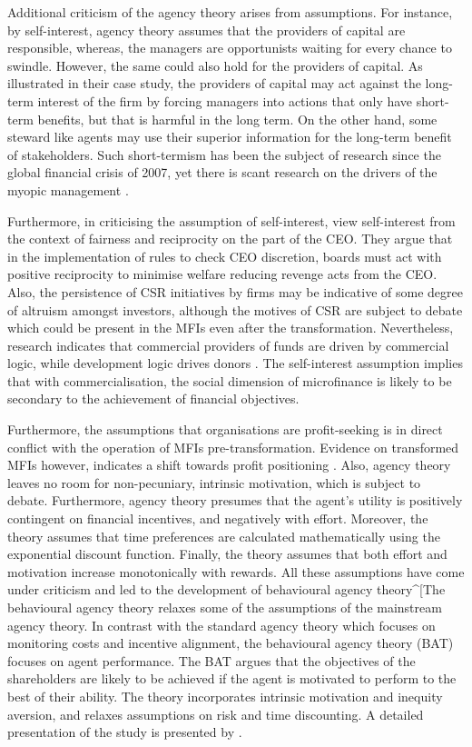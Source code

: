 \documentclass[a4paper,nobind]{templates/ociamthesis}
\begin{document}
Additional criticism of the agency theory arises from assumptions. For instance, by self-interest, agency theory assumes that the providers of capital are responsible, whereas, the managers are opportunists waiting for every chance to swindle. However, the same could also hold for the providers of capital. As \textcite{miller2011angel} illustrated in their case study, the providers of capital may act against the long-term interest of the firm by forcing managers into actions that only have short-term benefits, but that is harmful in the long term. On the other hand, some steward like agents may use their superior information for the long-term benefit of stakeholders. Such short-termism has been the subject of research since the global financial crisis of 2007, yet there is scant research on the drivers of the myopic management \autocite{dallas2011short}.

Furthermore, in criticising the assumption of self-interest, \textcite{bosse2016agency} view self-interest from the context of fairness and reciprocity on the part of the CEO. They argue that in the implementation of rules to check CEO discretion, boards must act with positive reciprocity to minimise welfare reducing revenge acts from the CEO. Also, the persistence of CSR initiatives by firms may be indicative of some degree of altruism amongst investors, although the motives of CSR are subject to debate \textcite{glegg2018corporate} which could be present in the MFIs even after the transformation. Nevertheless, research indicates that commercial providers of funds are driven by commercial logic, while development logic drives donors \autocite{cobb2016funding}. The self-interest assumption implies that with commercialisation, the social dimension of microfinance is likely to be secondary to the achievement of financial objectives.

Furthermore, the assumptions that organisations are profit-seeking is in direct conflict with the operation of MFIs pre-transformation. Evidence on transformed MFIs however, indicates a shift towards profit positioning \autocite{chahine2010social,d2017ngos}. Also, agency theory leaves no room for non-pecuniary, intrinsic motivation, which is subject to debate. Furthermore, agency theory presumes that the agent's utility is positively contingent on financial incentives, and negatively with effort. Moreover, the theory assumes that time preferences are calculated mathematically using the exponential discount function. Finally, the theory assumes that both effort and motivation increase monotonically with rewards. All these assumptions have come under criticism and led to the development of behavioural agency theory\^{}{[}The behavioural agency theory relaxes some of the assumptions of the mainstream agency theory. In contrast with the standard agency theory which focuses on monitoring costs and incentive alignment, the behavioural agency theory (BAT) focuses on agent performance. The BAT argues that the objectives of the shareholders are likely to be achieved if the agent is motivated to perform to the best of their ability. The theory incorporates intrinsic motivation and inequity aversion, and relaxes assumptions on risk and time discounting. A detailed presentation of the study is presented by \autocite{pepper2015behavioral}.
\end{document}
